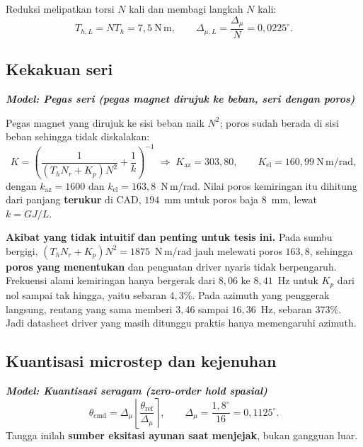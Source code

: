 \documentclass[11pt,a4paper]{article}
\newcommand{\degg}{^\circ}
\newcommand{\model}[1]{\textbf{\textit{Model: #1}}}
\begin{document}
Reduksi melipatkan torsi $N$ kali dan membagi langkah $N$ kali:
\begin{equation}
T_{h,L} = N T_h = 7{,}5 \ \mathrm{N\,m}, \qquad
\Delta_{\mu,L} = \frac{\Delta_\mu}{N} = 0{,}0225\degg .
\end{equation}

\subsection{Kekakuan seri}

\model{Pegas seri (pegas magnet dirujuk ke beban, seri dengan poros)}

Pegas magnet yang dirujuk ke sisi beban naik $N^2$; poros sudah berada di sisi beban sehingga tidak
diskalakan:
\begin{equation}
K = \left( \frac{1}{(T_h N_r + K_p) N^2} + \frac{1}{k} \right)^{-1}
\;\Longrightarrow\;
K_{\mathrm{az}} = 303{,}80, \qquad K_{\mathrm{el}} = 160{,}99 \ \mathrm{N\,m/rad},
\end{equation}
dengan $k_{\mathrm{az}} = 1600$ dan $k_{\mathrm{el}} = 163{,}8$~N\,m/rad. Nilai poros kemiringan itu
dihitung dari panjang \textbf{terukur} di CAD, $194$~mm untuk poros baja $8$~mm, lewat $k = GJ/L$.

\textbf{Akibat yang tidak intuitif dan penting untuk tesis ini.} Pada sumbu bergigi, $(T_h N_r + K_p)N^2
= 1875$~N\,m/rad jauh melewati poros $163{,}8$, sehingga \textbf{poros yang menentukan} dan penguatan
driver nyaris tidak berpengaruh. Frekuensi alami kemiringan hanya bergerak dari $8{,}06$ ke $8{,}41$~Hz
untuk $K_p$ dari nol sampai tak hingga, yaitu sebaran $4{,}3\%$. Pada azimuth yang penggerak langsung,
rentang yang sama memberi $3{,}46$ sampai $16{,}36$~Hz, sebaran $373\%$. Jadi datasheet driver yang masih
ditunggu praktis hanya memengaruhi azimuth.

\subsection{Kuantisasi microstep dan kejenuhan}

\model{Kuantisasi seragam (zero-order hold spasial)}
\begin{equation}
\theta_{\mathrm{cmd}} = \Delta_\mu \left\lfloor \frac{\theta_{\mathrm{ref}}}{\Delta_\mu} \right\rceil,
\qquad \Delta_\mu = \frac{1{,}8\degg}{16} = 0{,}1125\degg .
\end{equation}
Tangga inilah \textbf{sumber eksitasi ayunan saat menjejak}, bukan gangguan luar.
\end{document}
